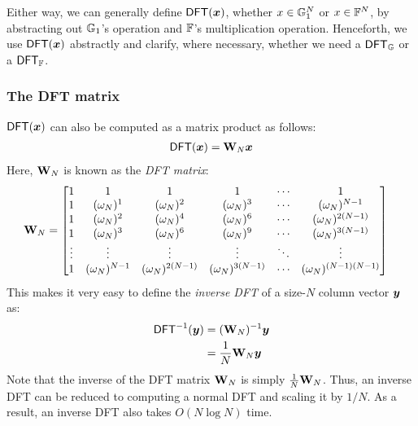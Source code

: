 \noindent Either way, we can generally define $\mathsf{DFT}(\bm{x})$, whether $x\in\mathbb{G}_1^N$ or $x\in \mathbb{F}^N$, by abstracting out $\mathbb{G}_1$'s operation and $\mathbb{F}$'s multiplication operation.
Henceforth, we use $\mathsf{DFT}(\bm{x})$ abstractly and clarify, where necessary, whether we need a $\mathsf{DFT}_{\mathbb{G}}$ or a $\mathsf{DFT}_{\mathbb{F}}$.

\subsubsection{The DFT matrix}
\label{s:dft:matrix}
$\mathsf{DFT}(\bm{x})$ can also be computed as a matrix product as follows:
\begin{align}
    \mathsf{DFT}(\bm{x}) = \mathbf{W}_N \bm{x}
\end{align}
Here, $\mathbf{W}_N$ is known as the \textit{DFT matrix}:
\begin{align}
    \mathbf{W}_N&=
    \begin{bmatrix}
        1&1&1&1&\cdots &1\\1&(\omega_N)^1&(\omega_N)^{2}&(\omega_N)^{3}&\cdots &(\omega_N)^{N-1}\\
        1&(\omega_N)^{2}&(\omega_N)^{4}&(\omega_N)^{6}&\cdots &(\omega_N)^{2(N-1)}\\
        1&(\omega_N)^{3}&(\omega_N)^{6}&(\omega_N)^{9}&\cdots &(\omega_N)^{3(N-1)}\\
        \vdots &\vdots &\vdots &\vdots &\ddots &\vdots \\
        1&(\omega_N)^{N-1}&(\omega_N)^{2(N-1)}&(\omega_N)^{3(N-1)}&\cdots &(\omega_N)^{(N-1)(N-1)}
    \end{bmatrix}
\end{align}
This makes it very easy to define the \textit{inverse DFT} of a size-$N$ column vector $\bm{y}$ as:
\begin{align}
    \mathsf{DFT}^{-1}(\bm{y}) &= (\mathbf{W}_N)^{-1} \bm{y}\\
        &= \frac{1}{N} \mathbf{W}_N \bm{y}
\end{align}
Note that the inverse of the DFT matrix $\mathbf{W}_N$ is simply $\frac{1}{N} \mathbf{W}_N$.
Thus, an inverse DFT can be reduced to computing a normal DFT and scaling it by $1/N$.
As a result, an inverse DFT also takes $O(N\log{N})$ time.


